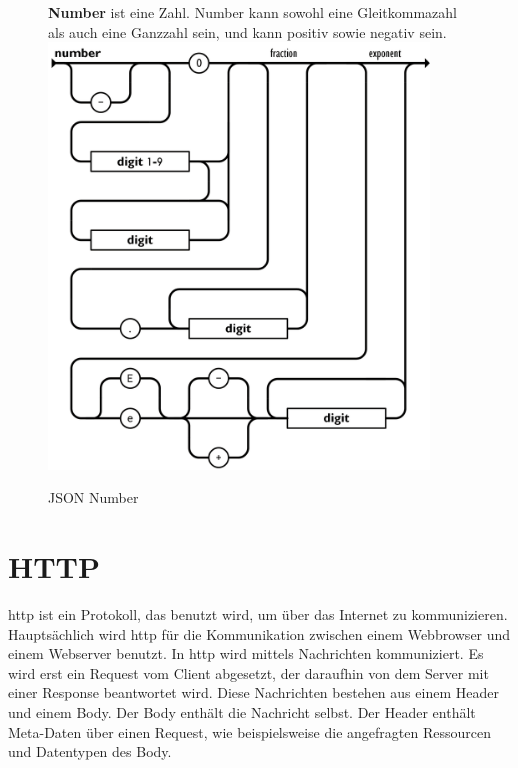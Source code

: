 \begin{figure}[H]
    \begin{minipage}[t]{0.45\textwidth}
        \textbf{Number} ist eine Zahl.
        Number kann sowohl eine Gleitkommazahl als auch eine Ganzzahl sein, und kann positiv sowie negativ sein.
        \includegraphics[width=0.9\textwidth]{images/json_number}
        \caption{JSON Number}
        \label{fig:json_number}
    \end{minipage}\hfill
\end{figure}

\section{HTTP}
\label{sec:http}

\ac{http} ist ein Protokoll, das benutzt wird, um über das Internet zu kommunizieren.
Hauptsächlich wird \ac{http} für die Kommunikation zwischen einem Webbrowser und einem Webserver benutzt.
In \ac{http} wird mittels Nachrichten kommuniziert.
Es wird erst ein Request vom Client abgesetzt, der daraufhin von dem Server mit einer Response beantwortet wird.
Diese Nachrichten bestehen aus einem Header und einem Body.
Der Body enthält die Nachricht selbst.
Der Header enthält Meta-Daten über einen Request, wie beispielsweise die angefragten Ressourcen und Datentypen des Body.


